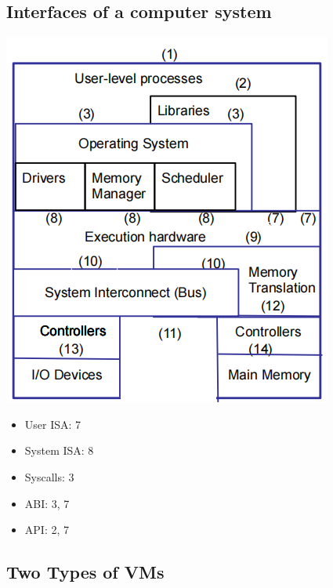 \documentclass[12pt]{article}
\begin{document}
\subsection{Interfaces of a computer system}
\includegraphics[width=\textwidth]{InterfacesInComputerSystem.png}
\begin{itemize}
    \item User ISA: 7
    \item System ISA: 8
    \item Syscalls: 3
    \item ABI: 3, 7
    \item API: 2, 7
\end{itemize}
\subsection{Two Types of VMs}
\end{document}
